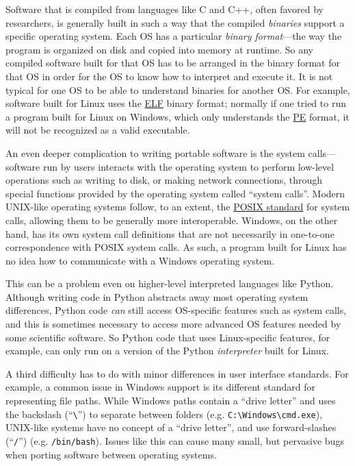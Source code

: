 \documentclass{deliverablereport}
\begin{document}
Software that is compiled from languages like C and C++, often favored
by researchers, is generally built in such a way that the compiled
\emph{binaries} support a specific operating system.  Each OS has a
particular \emph{binary format}---the way the program is organized on
disk and copied into memory at runtime.  So any compiled software
built for that OS has to be arranged in the binary format for that OS
in order for the OS to know how to interpret and execute it.  It is
not typical for one OS to be able to understand binaries for another
OS.  For example, software built for Linux uses the
\href{https://en.wikipedia.org/wiki/Executable_and_Linkable_Format}{ELF}
binary format; normally if one tried to run a program built for Linux
on Windows, which only understands the
\href{https://en.wikipedia.org/wiki/Portable_Executable}{PE} format,
it will not be recognized as a valid executable.

An even deeper complication to writing portable software is the system
calls--- software run by users interacts with the operating system to
perform low-level operations such as writing to disk, or making
network connections, through special functions provided by the
operating system called ``system calls''.  Modern UNIX-like operating
systems follow, to an extent, the
\href{https://en.wikipedia.org/wiki/POSIX}{POSIX standard} for system
calls, allowing them to be generally more interoperable.  Windows, on
the other hand, has its own system call definitions that are not
necessarily in one-to-one correspondence with POSIX system calls.  As
such, a program built for Linux has no idea how to communicate with a
Windows operating system.

This can be a problem even on higher-level interpreted languages like
Python.  Although writing code in Python abstracts away most operating
system differences, Python code \emph{can} still access OS-specific
features such as system calls, and this is sometimes necessary to
access more advanced OS features needed by some scientific software.
So Python code that uses Linux-specific features, for example, can
only run on a version of the Python \emph{interpreter} built for
Linux.

A third difficulty has to do with minor differences in user interface
standards.  For example, a common issue in Windows support is its
different standard for representing file paths.  While Windows paths
contain a ``drive letter'' and uses the backslash
(``\texttt{\textbackslash}'') to separate between folders (e.g.
\texttt{C:\textbackslash{}Windows\textbackslash{}cmd.exe}), UNIX-like
systems have no concept of a ``drive letter'', and use forward-slashes
(``\texttt{/}'') (e.g. \texttt{/bin/bash}).  Issues like this can cause
many small, but pervasive bugs when porting software between operating
systems.
\end{document}

